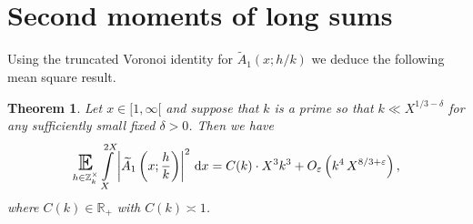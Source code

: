 \documentclass[a4paper,10pt,twoside]{amsart}
\newtheorem{theorem}{Theorem}[section]
\theoremstyle{definition}
\numberwithin{equation}{section}
\newcommand\E{\mathbb{E}}
\newcommand\eps{\varepsilon}
\renewcommand\:{\colon}
\begin{document}
\section{Second moments of long sums}

\noindent Using the truncated Voronoi identity for $\widetilde A_1(x;h/k)$ we deduce the following mean square result. 

\begin{theorem}\label{A1ms}
Let $x\in[1,\infty[$ and suppose that $k$ is a prime so that $k\ll X^{1/3-\delta}$ for any sufficiently small fixed $\delta>0$. Then we have
\begin{align*}
\mathop{\text{\LARGE$\E$}}_{h\in\mathbb Z_k^\times}\int\limits_X^{2X}\left|\widetilde A_1\left(x;\frac hk\right)\right|^2\,\mathrm dx
=C(k)\cdot X^3k^3+O_\eps\left(k^{4}\,X^{8/3+\eps}\right),
\end{align*}  
where $C(k)\in\mathbb R_+$ with $C(k)\asymp 1$.
\end{theorem}
\end{document}
